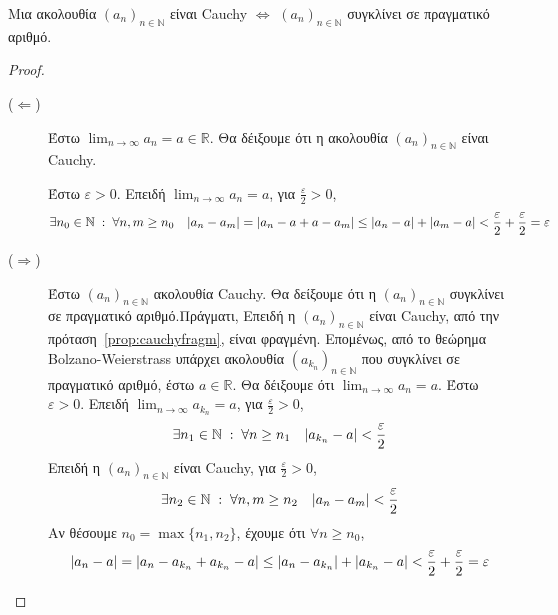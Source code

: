 \begin{mybox3}
  \begin{prop}
    Μια ακολουθία $ {(a_{n})}_{n \in \mathbb{N}} $ είναι Cauchy $ \Leftrightarrow $ 
    $ {(a_{n})}_{n \in \mathbb{N}} $ συγκλίνει σε πραγματικό αριθμό.
  \end{prop}
\end{mybox3}
\begin{proof}
\item {}
  \begin{description}
    \item [($ \Leftarrow $)] Έστω $ \lim_{n \to \infty} a_{n} = a \in \mathbb{R} $. 
      Θα δέιξουμε ότι η ακολουθία $ {(a_{n})}_{n \in \mathbb{N}} $ είναι Cauchy. 

      Έστω $ \varepsilon >0 $. Επειδή $ \lim_{n \to \infty} a_{n} = a $, για 
      $ \frac{\varepsilon}{2} > 0 $,
      \[ 
        \exists n_{0} \in \mathbb{N} \; : \; \forall n,m \geq n_{0} \quad 
        \abs{a_{n} - a_{m}} = 
        \abs{a_{n} - a + a - a_{m}} \leq \abs{a_{n}-a} + \abs{a_{m}-a} < 
        \frac{\varepsilon}{2} + \frac{\varepsilon}{2} = \varepsilon 
      \]
    \item [($ \Rightarrow $)] Έστω $ {(a_{n})}_{n \in \mathbb{N}} $ ακολουθία Cauchy. 
      Θα δείξουμε ότι η $ {(a_{n})}_{n \in \mathbb{N}} $ συγκλίνει σε πραγματικό
      αριθμό.Πράγματι, 
      Επειδή η $ {(a_{n})}_{n \in \mathbb{N}} $ είναι Cauchy, από την
      πρόταση~\ref{prop:cauchyfragm}, είναι φραγμένη. Επομένως, από το θεώρημα 
      Bolzano-Weierstrass υπάρχει ακολουθία $ (a_{k_{n}})_{n \in \mathbb{N}} $ 
      που συγκλίνει σε πραγματικό αριθμό, έστω $ a \in \mathbb{R} $. Θα δέιξουμε ότι 
      $ \lim_{n \to \infty} a_{n} = a $. Έστω $ \varepsilon >0 $. Επειδή $ \lim_{n \to
      \infty} a_{k_{n}} = a $, για $ \frac{\varepsilon}{2} > 0 $, 
      \[
        \exists n_{1} \in \mathbb{N} \; : \; \forall n \geq n_{1} \quad 
        \abs{a_{k_{n}}-a} < \frac{\varepsilon}{2}
      \] 
      Επειδή η $ {(a_{n})}_{n \in \mathbb{N}} $ είναι Cauchy, για $
      \frac{\varepsilon}{2} >0 $, 
      \[
        \exists n_{2} \in \mathbb{N} \; : \; \forall n,m \geq n_{2} \quad 
        \abs{a_{n}-a_{m}} < \frac{\varepsilon}{2}
      \] 
      Αν θέσουμε $ n_{0} = \max \{ n_{1}, n_{2} \} $, έχουμε ότι $ \forall n \geq n_{0}
      $, 
      \[
        \abs{a_{n}-a} = \abs{a_{n}-a_{k_{n}} + a_{k_{n}} - a} \leq \abs{a_{n}-
        a_{k_{n}}} + \abs{a_{k_{n}} - a} < \frac{\varepsilon}{2} + \frac{\varepsilon}{2}
        = \varepsilon 
      \] 
  \end{description}
\end{proof}


